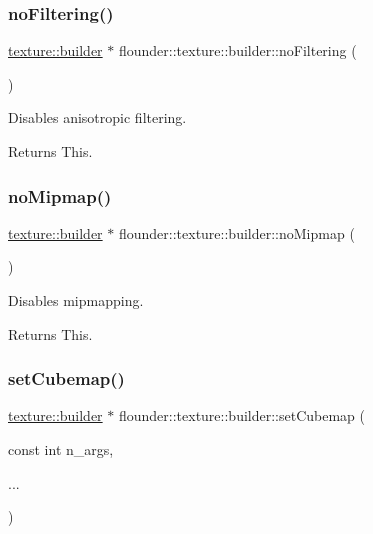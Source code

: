 \subsubsection{\texorpdfstring{no\+Filtering()}{noFiltering()}}
{\footnotesize\ttfamily \hyperlink{classflounder_1_1texture_1_1builder}{texture\+::builder} $\ast$ flounder\+::texture\+::builder\+::no\+Filtering (\begin{DoxyParamCaption}{ }\end{DoxyParamCaption})}



Disables anisotropic filtering. 

\begin{DoxyReturn}{Returns}
This. 
\end{DoxyReturn}
\mbox{\label{classflounder_1_1texture_1_1builder_a50118f124ac5bb262a4050d1f1abc18b}} 
\subsubsection{\texorpdfstring{no\+Mipmap()}{noMipmap()}}
{\footnotesize\ttfamily \hyperlink{classflounder_1_1texture_1_1builder}{texture\+::builder} $\ast$ flounder\+::texture\+::builder\+::no\+Mipmap (\begin{DoxyParamCaption}{ }\end{DoxyParamCaption})}



Disables mipmapping. 

\begin{DoxyReturn}{Returns}
This. 
\end{DoxyReturn}
\mbox{\label{classflounder_1_1texture_1_1builder_ad6813f7dd9b094cd3764c5879171dc04}} 
\subsubsection{\texorpdfstring{set\+Cubemap()}{setCubemap()}}
{\footnotesize\ttfamily \hyperlink{classflounder_1_1texture_1_1builder}{texture\+::builder} $\ast$ flounder\+::texture\+::builder\+::set\+Cubemap (\begin{DoxyParamCaption}\item[{const int}]{n\+\_\+args,  }\item[{}]{... }\end{DoxyParamCaption})}




